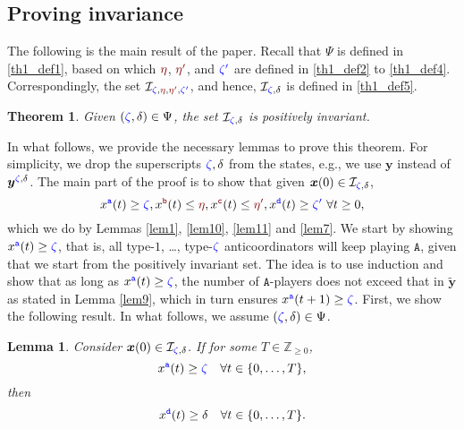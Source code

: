 \documentclass[10 pt,twocolumn,journal]{IEEEtran}
\theoremstyle{plain}
\newtheorem{theorem}{Theorem}
\newtheorem{lemma}{Lemma}
\newcommand{\A}{\mathcal{A}}
\newcommand{\I}{\mathcal{I}}
\newcommand{\x}{\bm{x}}
\newcommand{\y}{\bm{y}}
\renewcommand{\r}{\tb{\zeta}}
\newcommand{\rr}{\tb{\zeta'}}
\newcommand{\s}{\tr{\eta}}
\renewcommand{\ss}{\tr{\eta'}}
\renewcommand{\d}{{\delta}}
\newcommand{\n}{\tb{\mathtt{a}}}
\renewcommand{\o}{\tr{\mathtt{b}}}
\newcommand{\oo}{\tr{\mathtt{c}}}
\newcommand{\nn}{\tb{\mathtt{d}}}
\renewcommand{\A}{\mathtt{A}}
\newcommand{\tb}{\textcolor{blue}}
\newcommand{\tr}{\textcolor{Myred}}
\theoremstyle{definition}
\begin{document}
\subsection{Proving invariance} \label{sec_provingInvariance}
The following is the main result of the paper.
Recall that $\Psi$ is defined in \eqref{th1_def1}, based on which $\s$, $\ss$, and $\rr$ are defined in \eqref{th1_def2} to \eqref{th1_def4}. 
Correspondingly, the set $\I_{\r, \s, \ss, \rr}$, and hence, $\I_{\r,\d}$ is defined in \eqref{th1_def5}.
\begin{theorem} \label{th1}
    Given $(\r,\d)\in \Psi$,
    the set $\I_{\r,\d}$ is positively invariant.
\end{theorem}
In what follows, we provide the necessary lemmas to prove this theorem.
For simplicity, we drop the superscripts ${\r,\d}$ from the states, e.g., we use $\y$ instead of $\y^{\r,\d}$.
The main part of the proof is to show that given $\x(0)\in\I_{\r,\d}$,
\begin{equation*}
    x^{\n}(t) \geq \r, 
    x^{\o}(t) \leq \s,
    x^{\oo}(t) \leq \ss,
    x^{\nn}(t) \geq \rr\  \forall t\geq 0,
\end{equation*}
which we do by Lemmas \ref{lem1}, \ref{lem10}, \ref{lem11} and \ref{lem7}.
We start by showing $x^{\n}(t) \geq \r$, that is, all type-$1$, \ldots, type-$\r$ anticoordinators will keep playing $\A$, given that we start from the positively invariant set. 
The idea is to use induction and show that as long as $x^{\n}(t)\geq \r$, the number of $\A$-players does not exceed that in $\tilde{\y}$ as stated in Lemma \ref{lem9}, which in turn ensures $x^{\n}(t+1)\geq \r$. 
First, we show the following result.
In what follows, we assume $(\r,\d)\in \Psi$.
%
\begin{lemma}   \label{lem15} 
    Consider $\x(0)\in\I_{\r,\d}$.
    If for some $T\in\mathbb{Z}_{\geq0}$,  
    \begin{equation}   \label{lem15-eq01}
        x^{\n}(t) \geq \r \quad \forall t\in\{0,\ldots, T\},
    \end{equation}
    then  
    \begin{equation}   \label{lem15-eq02}
         x^{\nn}(t) \geq \d \quad \forall t\in\{0,\ldots, T\}.%
    \end{equation}
\end{lemma}
\end{document}
